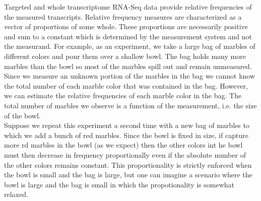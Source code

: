 \documentclass{article}\usepackage[]{graphicx}\usepackage[]{color}
\theoremstyle{definition}
\begin{document}
Targeted and whole transcriptome RNA-Seq data provide relative frequencies of the measured transcripts.  Relative frequency measures are characterized as a vector of proportions of some whole.  These proportions are necessarily positive and sum to a constant which is determined by the measurement system and not the measurand.  For example, as an experiment, we take a large bag of marbles of different colors and pour them over a shallow bowl.  The bag holds many more marbles than the bowl so most of the marbles spill out and remain unmeasured.  Since we measure an unknown portion of the marbles in the bag we cannot know the total number of each marble color that was contained in the bag.  However, we can estimate the relative frequencies of each marble color in the bag.  The total number of marbles we observe is a function of the measurement, i.e. the size of the bowl.\\



Suppose we repeat this experiment a second time with a new bag of marbles to which we add a bunch of red marbles.  Since the bowl is fixed in size, if capture more rd marbles in the bowl (as we expect) then the other colors int he bowl must then decrease in frequency proportionally even if the absolute number of the other colors remains constant.  This proportionality is strictly enforced when the bowl is small and the bag is large, but one can imagine a scenario where the bowl is large and the bag is small in which the propotionality is somewhat relaxed.\\
\end{document}
